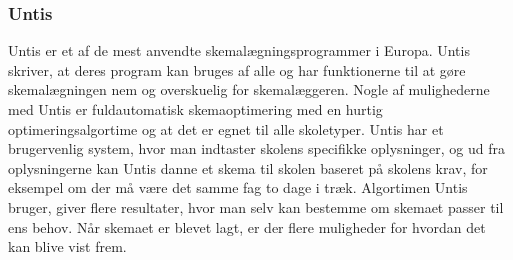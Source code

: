 \subsubsection{Untis}
Untis er et af de mest anvendte skemalægningsprogrammer i Europa. Untis skriver, at deres program kan bruges af alle og har funktionerne til at gøre skemalægningen nem og overskuelig for skemalæggeren. Nogle af mulighederne med Untis er fuldautomatisk skemaoptimering med en hurtig optimeringsalgortime og at det er egnet til alle skoletyper.\cite{UntisDK}
Untis har et brugervenlig system, hvor man indtaster skolens specifikke oplysninger, og ud fra oplysningerne kan Untis danne et skema til skolen baseret på skolens krav, for eksempel om der må være det samme fag to dage i træk.
Algortimen Untis bruger, giver flere resultater, hvor man selv kan bestemme om skemaet passer til ens behov. Når skemaet er blevet lagt, er der flere muligheder for hvordan det kan blive vist frem.\cite{UntisInt}


